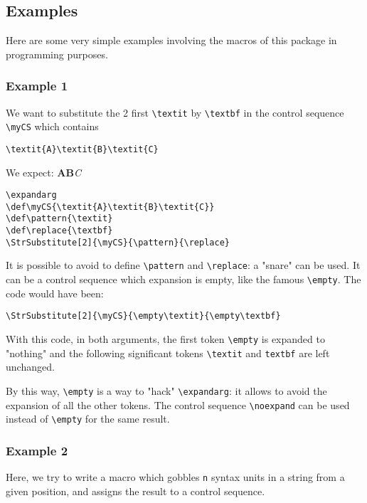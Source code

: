 \documentclass[a4paper,10pt]{article}
\newcommand\USs{syntax units\xspace}
\newcommand\styleexercice{\footnotesize}
\newcommand\verbinline{\lstinline[basicstyle=\normalsize\ttfamily]}
\begin{document}
\subsection{Examples}
\label{exemples}
Here are some very simple examples involving the macros of this package in programming purposes.

\subsubsection{Example 1}
We want to substitute the 2 first \verbinline|\textit| by \verbinline|\textbf| in the control sequence \verb|\myCS| which contains \par\smallskip
\hfill\verbinline|\textit{A}\textit{B}\textit{C}|\hfill{}
\medskip

We expect: \textbf{A}\textbf{B}\textit{C}\medskip

\begin{minipage}[c]{0.65\linewidth}
\begin{lstlisting}
\expandarg
\def\myCS{\textit{A}\textit{B}\textit{C}}
\def\pattern{\textit}
\def\replace{\textbf}
\StrSubstitute[2]{\myCS}{\pattern}{\replace}
\end{lstlisting}%
\end{minipage}\hfill
\begin{minipage}[c]{0.35\linewidth}
	\styleexercice
	\expandarg
	\def\myCS{\textit{A}\textit{B}\textit{C}}
	\def\pattern{\textit}
	\def\replace{\textbf}
	\StrSubstitute[2]{\myCS}{\pattern}{\replace}
\end{minipage}%
\medskip

It is possible to avoid to define \verb|\pattern| and \verb|\replace|: a "snare" can be used. It can be a control sequence which expansion is empty, like the famous \verbinline|\empty|. The code would have been:\par\nobreak\smallskip
\hfil\verbinline|\StrSubstitute[2]{\myCS}{\empty\textit}{\empty\textbf}|\hfil{}\medskip

With this code, in both arguments, the first token \verbinline|\empty| is expanded to "nothing" and the following significant tokens \verbinline|\textit| and \verbinline|textbf| are left unchanged.\smallskip

By this way, \verbinline|\empty| is a way to "hack" \verbinline|\expandarg|: it allows to avoid the expansion of all the other tokens. The control sequence \verbinline|\noexpand| can be used instead of \verbinline|\empty| for the same result.

\subsubsection{Example 2}
Here, we try to write a macro which gobbles \verb|n| \USs in a string from a given position, and assigns the result to a control sequence.
\end{document}
